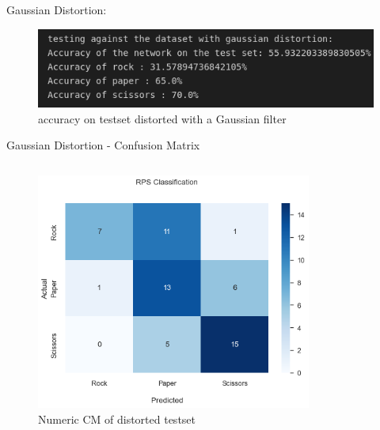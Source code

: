 \documentclass[aspectratio=169]{beamer}
\begin{document}
{	\begin{frame}
		Gaussian Distortion:
		\begin{figure}
			\centering
			\includegraphics[width=1\textwidth]{img/TestAccuracyRPS_gaussDis_10.png}
			\caption{accuracy on testset distorted with a Gaussian filter}
		\end{figure}   
	\end{frame}

	\begin{frame}{Gaussian Distortion - Confusion Matrix}
		\begin{columns}
			\begin{column}{.5\textwidth}
				\begin{figure}
					\centering
					\includegraphics[width=1\textwidth]{img/CFM_Gauss_numeric_10.png}
					\caption{Numeric CM of distorted testset}
				\end{figure}      
			\end{column}
			\begin{column}{.5\textwidth}
				\begin{figure}
					\centering

\end{figure}
\end{column}
\end{columns}
\end{frame}}
\end{document}

